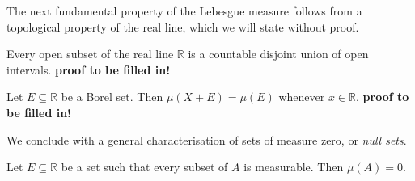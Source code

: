 The next fundamental property of the Lebesgue measure follows from a topological property of the real line, which we will state without proof.

\begin{proposition}
Every open subset of the real line $\mathbb R$ is a countable disjoint union of open intervals.
\textbf{proof to be filled in!}
\end{proposition}

\begin{corollary} \label{translation}
Let $E\subseteq {\mathbb R}$ be a Borel set.  Then $\mu (X+E) = \mu (E)$ whenever $x\in {\mathbb R}$.
\textbf{proof to be filled in!}
\end{corollary}

We conclude with a general characterisation of sets of measure zero, or {\em null sets}.

\begin{theorem}
Let $E\subseteq {\mathbb R}$ be a set such that every subset of $A$ is measurable.  Then $\mu (A) =0$.
\end{theorem}


